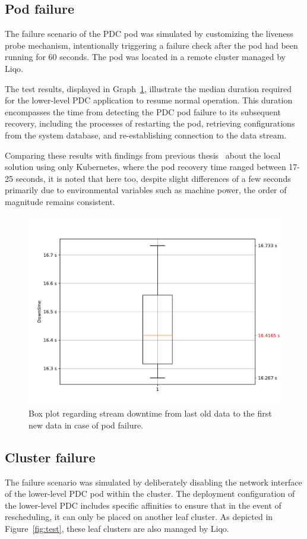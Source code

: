 \subsection{Pod failure}
The failure scenario of the PDC pod was simulated by customizing the liveness probe mechanism, intentionally triggering a failure check after the pod had been running for 60 seconds. The pod was located in a remote cluster managed by Liqo.

The test results, displayed in Graph~\ref{graph:pod-down}, illustrate the median duration required for the lower-level PDC application to resume normal operation. This duration encompasses the time from detecting the PDC pod failure to its subsequent recovery, including the processes of restarting the pod, retrieving configurations from the system database, and re-establishing connection to the data stream.

Comparing these results with findings from previous thesis~\cite{e3-1} about the local solution using only Kubernetes,  where the pod recovery time ranged between 17-25 seconds, it is noted that here too, despite slight differences of a few seconds primarily due to environmental variables such as machine power, the order of magnitude remains consistent. 

\begin{figure}[ht]\centering
\includegraphics[scale=0.5]{Pictures/pdc-pod-down}
\caption{Box plot regarding stream downtime from last old data to the first new data in case of pod failure.}\label{graph:pod-down}
\end{figure}

\subsection{Cluster failure}
The failure scenario was simulated by deliberately disabling the network interface of the lower-level PDC pod within the cluster. The deployment configuration of the lower-level PDC includes specific affinities to ensure that in the event of rescheduling, it can only be placed on another leaf cluster. As depicted in Figure~\ref{fig:test}, these leaf clusters are also managed by Liqo.

